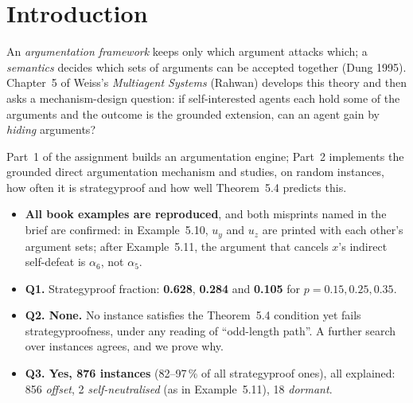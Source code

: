 \documentclass[10pt,a4paper]{article}
\begin{document}
{\hypersetup{linkcolor=brand}\sffamily
\renewcommand{\contentsname}{\color{brand}Contents}
\tableofcontents}
\clearpage
{}

\section{Introduction}

An \emph{argumentation framework} keeps only which argument attacks which; a \emph{semantics} decides which sets of
arguments can be accepted together (Dung 1995). Chapter~5 of Weiss's \emph{Multiagent Systems} (Rahwan) develops this theory
and then asks a mechanism-design question: if self-interested agents each hold some of the arguments and the outcome is the
grounded extension, can an agent gain by \emph{hiding} arguments?

Part~1 of the assignment builds an argumentation engine; Part~2 implements the grounded direct argumentation mechanism and
studies, on random instances, how often it is strategyproof and how well Theorem~5.4 predicts this.

\begin{keybox}
\begin{itemize}
  \item \textbf{All book examples are reproduced}, and both misprints named in the brief are confirmed: in Example~5.10,
        $u_y$ and $u_z$ are printed with each other's argument sets; after Example~5.11, the argument that cancels $x$'s
        indirect self-defeat is $\alpha_6$, not $\alpha_5$.
  \item \textbf{Q1.} Strategyproof fraction: \textbf{0.628}, \textbf{0.284} and \textbf{0.105} for $p = 0.15, 0.25, 0.35$.
  \item \textbf{Q2. None.} No instance satisfies the Theorem~5.4 condition yet fails strategyproofness, under any reading of
        ``odd-length path''. A further search over \StressGrandTotal{} instances agrees, and we prove why.
  \item \textbf{Q3. Yes, 876 instances} (82--97\,\% of all strategyproof ones), all explained: 856 \emph{offset}, 2
        \emph{self-neutralised} (as in Example~5.11), 18 \emph{dormant}.
\end{itemize}
\end{keybox}
\end{document}

